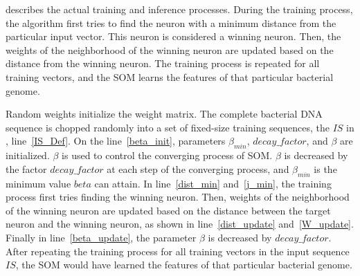  describes the actual training and inference processes. During the training process, the algorithm first tries to find the neuron with a minimum distance from the particular input vector. This neuron is considered a winning neuron. Then, the weights of the neighborhood of the winning neuron are updated based on the distance from the winning neuron. The training process is repeated for all training vectors, and the SOM learns the features of that particular bacterial genome.

Random weights initialize the weight matrix. The complete bacterial DNA sequence is chopped randomly into a set of fixed-size training sequences, the $IS$ in , line~\ref{IS_Def}. On the line~\ref{beta_init}, parameters $\beta_{min}$, $decay\_factor$, and $\beta$ are initialized. $\beta$ is used to control the converging process of SOM. $\beta$ is decreased by the factor $decay\_factor$ at each step of the converging process, and $\beta_{min}$ is the minimum value $beta$ can attain. In line~\ref{dist_min} and~\ref{j_min}, the training process first tries finding the winning neuron. Then, weights of the neighborhood of the winning neuron are updated based on the distance between the target neuron and the winning neuron, as shown in line~\ref{dist_update} and~\ref{W_update}. Finally in line~\ref{beta_update}, the parameter $\beta$ is decreased by $decay\_factor$. After repeating the training process for all training vectors in the input sequence $IS$, the SOM would have learned the features of that particular bacterial genome. 

